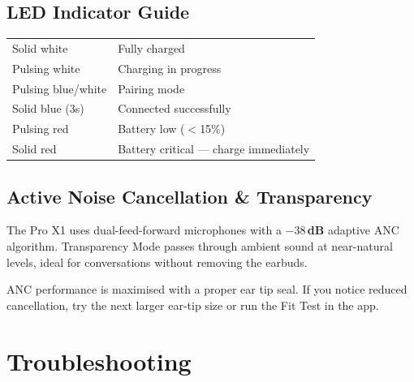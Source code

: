 \documentclass[11pt, a4paper]{article}
\begin{document}
\subsection{LED Indicator Guide}

\begin{tabularx}{\linewidth}{@{}K@{\hspace{8mm}}>{\raggedright\arraybackslash}X@{}}
\setlength{\parskip}{0pt}%
Solid white       & Fully charged \\
Pulsing white     & Charging in progress \\
Pulsing blue/white & Pairing mode \\
Solid blue (3s)   & Connected successfully \\
Pulsing red       & Battery low ($<$15\%) \\
Solid red         & Battery critical — charge immediately \\
\end{tabularx}

\subsection{Active Noise Cancellation \& Transparency}

The Pro X1 uses dual-feed-forward microphones with a \textbf{$-38$\,dB} adaptive ANC
algorithm. Transparency Mode passes through ambient sound at near-natural levels,
ideal for conversations without removing the earbuds.

\begin{tipbox}
  ANC performance is maximised with a proper ear tip seal. If you notice reduced
  cancellation, try the next larger ear-tip size or run the Fit Test in the app.
\end{tipbox}

\newpage

\section{Troubleshooting}

\renewcommand{\arraystretch}{1.3}
\setlength{\parskip}{0pt}
\end{document}
